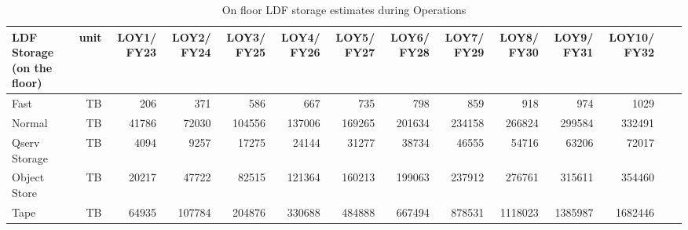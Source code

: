 \tiny \begin{longtable} { |p{}  |r  |r  |r  |r  |r  |r  |r  |r  |r  |r  |r  |r  |r |} 
\caption{On floor LDF storage estimates during Operations
 \label{tab:storageFloorOps}}\\ 
\hline 
\textbf{LDF Storage (on the floor)}&\textbf{unit}&\textbf{LOY1/ FY23}&\textbf{LOY2/ FY24}&\textbf{LOY3/ FY25}&\textbf{LOY4/ FY26}&\textbf{LOY5/ FY27}&\textbf{LOY6/ FY28}&\textbf{LOY7/ FY29}&\textbf{LOY8/ FY30}&\textbf{LOY9/ FY31}&\textbf{LOY10/ FY32}& \\ \hline
{Fast}&{TB}&{206}&{371}&{586}&{667}&{735}&{798}&{859}&{918}&{974}&{1029}& \\ \hline
{Normal}&{TB}&{41786}&{72030}&{104556}&{137006}&{169265}&{201634}&{234158}&{266824}&{299584}&{332491}& \\ \hline
{Qserv Storage}&{TB}&{4094}&{9257}&{17275}&{24144}&{31277}&{38734}&{46555}&{54716}&{63206}&{72017}& \\ \hline
{Object Store}&{TB}&{20217}&{47722}&{82515}&{121364}&{160213}&{199063}&{237912}&{276761}&{315611}&{354460}& \\ \hline
{Tape}&{TB}&{64935}&{107784}&{204876}&{330688}&{484888}&{667494}&{878531}&{1118023}&{1385987}&{1682446}& \\ \hline
\end{longtable} \normalsize
